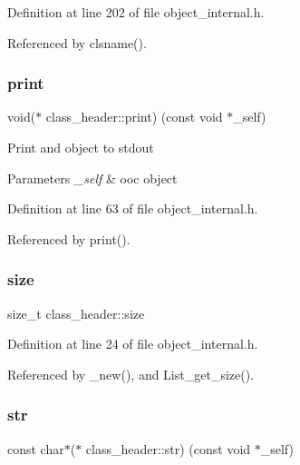 Definition at line 202 of file object\+\_\+internal.\+h.



Referenced by clsname().

\mbox{\label{structclass__header_a23181c1eac1455a8f23dd9d14f8b6abd}} 
\subsubsection{\texorpdfstring{print}{print}}
{\footnotesize\ttfamily void($\ast$ class\+\_\+header\+::print) (const void $\ast$\+\_\+self)}

Print and object to stdout 
\begin{DoxyParams}{Parameters}
{\em \+\_\+self} & ooc object \\
\hline
\end{DoxyParams}


Definition at line 63 of file object\+\_\+internal.\+h.



Referenced by print().

\mbox{\label{structclass__header_a5ba6bf54fc12a2a31a2b39937cd50e84}} 
\subsubsection{\texorpdfstring{size}{size}}
{\footnotesize\ttfamily size\+\_\+t class\+\_\+header\+::size}



Definition at line 24 of file object\+\_\+internal.\+h.



Referenced by \+\_\+new(), and List\+\_\+get\+\_\+size().

\mbox{\label{structclass__header_af8a0a6de1e1eb96faab68cc58fcf84d0}} 
\subsubsection{\texorpdfstring{str}{str}}
{\footnotesize\ttfamily const char$\ast$($\ast$ class\+\_\+header\+::str) (const void $\ast$\+\_\+self)}


